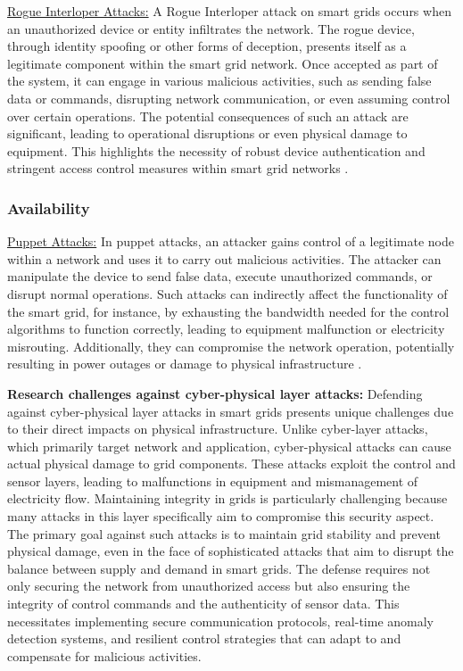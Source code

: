 \documentclass[10pt, journal]{IEEEtran}
\begin{document}
\underline{Rogue Interloper Attacks:} A Rogue Interloper attack on smart grids occurs when an unauthorized device or entity infiltrates the network. The rogue device, through identity spoofing or other forms of deception, presents itself as a legitimate component within the smart grid network. Once accepted as part of the system, it can engage in various malicious activities, such as sending false data or commands, disrupting network communication, or even assuming control over certain operations. The potential consequences of such an attack are significant, leading to operational disruptions or even physical damage to equipment. This highlights the necessity of robust device authentication and stringent access control measures within smart grid networks \cite{east2009taxonomy,siddavatam2015security}.

\subsubsection{Availability}

\underline{Puppet Attacks:} In puppet attacks, an attacker gains control of a legitimate node within a network and uses it to carry out malicious activities. The attacker can manipulate the device to send false data, execute unauthorized commands, or disrupt normal operations. Such attacks can indirectly affect the functionality of the smart grid, for instance, by exhausting the bandwidth needed for the control algorithms to function correctly, leading to equipment malfunction or electricity misrouting. Additionally, they can compromise the network operation, potentially resulting in power outages or damage to physical infrastructure \cite{yi2016puppet}.

\textbf{Research challenges against cyber-physical layer attacks:} Defending against cyber-physical layer attacks in smart grids presents unique challenges due to their direct impacts on physical infrastructure. Unlike cyber-layer attacks, which primarily target network and application, cyber-physical attacks can cause actual physical damage to grid components. These attacks exploit the control and sensor layers, leading to malfunctions in equipment and mismanagement of electricity flow. Maintaining integrity in grids is particularly challenging because many attacks in this layer specifically aim to compromise this security aspect. The primary goal against such attacks is to maintain grid stability and prevent physical damage, even in the face of sophisticated attacks that aim to disrupt the balance between supply and demand in smart grids. The defense requires not only securing the network from unauthorized access but also ensuring the integrity of control commands and the authenticity of sensor data. This necessitates implementing secure communication protocols, real-time anomaly detection systems, and resilient control strategies that can adapt to and compensate for malicious activities. 
\end{document}
